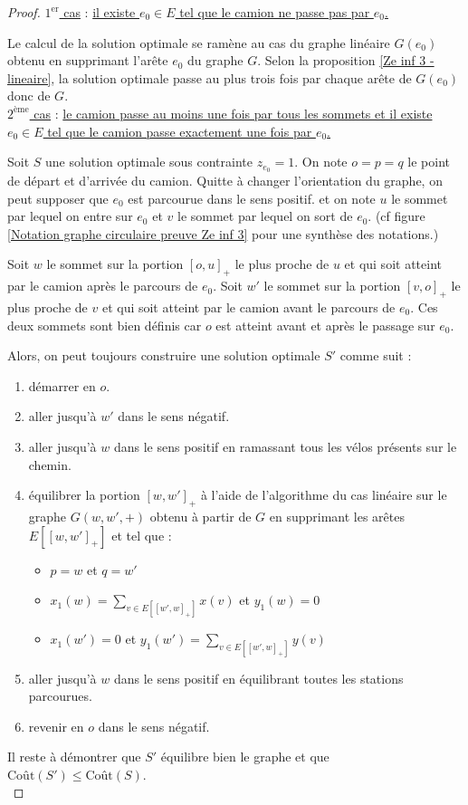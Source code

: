 \begin{proof}\uline{$1^{\mbox{er}}$ cas} : \uline{il existe $e_0 \in E$ tel que le camion ne passe pas par $e_0$.}

Le calcul de la solution optimale se ramène au cas du graphe linéaire $G(e_0)$ obtenu en supprimant l'arête $e_0$ du graphe $G$. Selon la proposition \ref{Ze inf 3 - lineaire}, la solution optimale passe au plus trois fois par chaque arête de $G(e_0)$ donc de $G$.
\\

\uline{$2^{\mbox{ème}}$ cas} : \uline{le camion passe au moins une fois par tous les sommets et il existe $e_0 \in E$ tel que le camion passe exactement une fois par $e_0$.}

Soit $S$ une solution optimale sous contrainte $z_{e_0} = 1$. On note $o=p=q$ le point de départ et d'arrivée du camion. Quitte à changer l'orientation du graphe, on peut supposer que $e_0$ est parcourue dans le sens positif. et on note $u$ le sommet par lequel on entre sur $e_0$ et $v$ le sommet par lequel on sort de $e_0$. (cf figure \ref{Notation graphe circulaire preuve Ze inf 3} pour une synthèse des notations.)

Soit $w$ le sommet sur la portion $[o,u]_+$ le plus proche de $u$ et qui soit atteint par le camion après le parcours de $e_0$. Soit $w'$ le sommet sur la portion $[v,o]_+$ le plus proche de $v$ et qui soit atteint par le camion avant le parcours de $e_0$. Ces deux sommets sont bien définis car $o$ est atteint avant et après le passage sur $e_0$.

Alors, on peut toujours construire une solution optimale $S'$ comme suit :
\begin{enumerate}
\item\label{NewS1} démarrer en $o$.
\item\label{NewS2} aller jusqu'à $w'$ dans le sens négatif.
\item\label{NewS3} aller jusqu'à $w$ dans le sens positif en ramassant tous les vélos présents sur le chemin.
\item\label{NewS4} équilibrer la portion $[w,w']_+$ à l'aide de l'algorithme du cas linéaire sur le graphe $G(w,w',+)$ obtenu à partir de $G$ en supprimant les arêtes $E\left[[w,w']_+\right]$ et tel que :
  \begin{itemize}
  \item $p=w$ et $q=w'$
  \item $\displaystyle x_1(w) = \sum_{v \in E\left[ \left[w',w\right]_+ \right]} x(v)$ et $y_1(w) = 0$
  \item $x_1(w') = 0$ et $\displaystyle y_1(w') = \sum_{v \in E\left[ \left[w',w\right]_+ \right]} y(v)$
  \end{itemize}
\item\label{NewS5} aller jusqu'à $w$ dans le sens positif en équilibrant toutes les stations parcourues.
\item\label{NewS6} revenir en $o$ dans le sens négatif.
\end{enumerate}
Il reste à démontrer que $S'$ équilibre bien le graphe et que $\mbox{Coût}(S') \le \mbox{Coût}(S)$.
\\


\end{proof}
